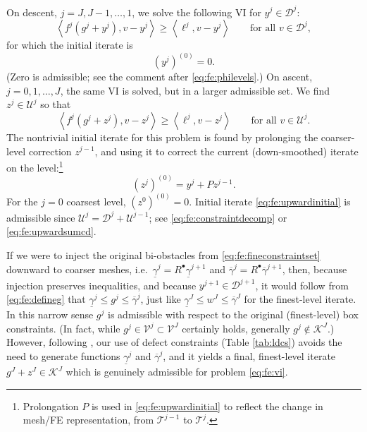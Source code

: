 \documentclass[letterpaper,final,12pt,reqno]{amsart}
\theoremstyle{cstyle}
\theoremstyle{cstyle*}
\theoremstyle{dstyle}
\numberwithin{equation}{section}
\numberwithin{figure}{section}
\numberwithin{table}{section}
\numberwithin{theorem}{section}
\newcommand{\cK}{\mathcal{K}}
\newcommand{\cV}{\mathcal{V}}
\newcommand{\ip}[2]{\left<#1,#2\right>}
\newcommand{\iR}{R^{\bullet}}
\begin{document}
On descent, $j=J,J-1,\dots,1$, we solve the following VI for $y^j \in \mathcal{D}^j$:
\begin{equation}
\ip{f^j(g^j + y^j)}{v-y^j} \ge \ip{\ell^j}{v-y^j} \qquad \text{for all } v\in \mathcal{D}^j, \label{eq:fe:downvi}
\end{equation}
for which the initial iterate is
\begin{equation}
(y^j)^{(0)}=0.  \label{eq:fe:downwardinitial}
\end{equation}
(Zero is admissible; see the comment after \eqref{eq:fe:philevels}.)  On ascent, $j=0,1,\dots,J$, the same VI is solved, but in a larger admissible set.  We find $z^j \in \mathcal{U}^j$ so that
\begin{equation}
\ip{f^j(g^j + z^j)}{v-z^j} \ge \ip{\ell^j}{v-z^j} \qquad \text{for all } v\in \mathcal{U}^j. \label{eq:fe:upvi}
\end{equation}
The nontrivial initial iterate for this problem is found by prolonging the coarser-level correction $z^{j-1}$, and using it to correct the current (down-smoothed) iterate on the level:\footnote{Prolongation $P$ is used in \eqref{eq:fe:upwardinitial} to reflect the change in mesh/FE representation, from $\mathcal{T}^{j-1}$ to $\mathcal{T}^{j}$.}
\begin{equation}
(z^j)^{(0)} = y^j + P z^{j-1}.  \label{eq:fe:upwardinitial}
\end{equation}
For the $j=0$ coarsest level, $(z^0)^{(0)}=0$.  Initial iterate \eqref{eq:fe:upwardinitial} is admissible since $\mathcal{U}^j = \mathcal{D}^j + \mathcal{U}^{j-1}$; see \eqref{eq:fe:constraintdecomp} or \eqref{eq:fe:upwardsumcd}.

If we were to inject the original bi-obstacles from \eqref{eq:fe:fineconstraintset} downward to coarser meshes, i.e.~$\underline{\gamma}^j = \iR \underline{\gamma}^{j+1}$ and $\overline{\gamma}^j = \iR \overline{\gamma}^{j+1}$, then, because injection preserves inequalities, and because $y^{j+1} \in \mathcal{D}^{j+1}$, it would follow from \eqref{eq:fe:defineg} that $\underline{\gamma}^j \le g^j \le \overline{\gamma}^j$, just like $\underline{\gamma}^J \le w^J \le \overline{\gamma}^J$ for the finest-level iterate.  In this narrow sense $g^j$ is admissible with respect to the original (finest-level) box constraints.  (In fact, while $g^j \in \cV^j \subset \cV^J$ certainly holds, generally $g^j \notin \cK^J$.)  However, following \cite{GraeserKornhuber2009}, our use of defect constraints (Table \ref{tab:ldcs}) avoids the need to generate functions $\underline{\gamma}^j$ and $\overline{\gamma}^j$, and it yields a final, finest-level iterate $g^J+z^J \in \cK^J$ which is genuinely admissible for problem \eqref{eq:fe:vi}.
\end{document}
